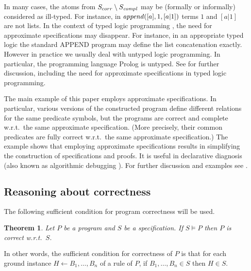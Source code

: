 \documentclass{tlp}
\newtheorem{theorem}{Theorem}
\newcommand*{\seq}[2][n]  {{#2_{1}, \allowbreak \ldots, \allowbreak #2_{#1}}}
\begin{document}
In many cases, the atoms from $S_{corr}\setminus S_{\it c o m p l}$ 
may be (formally or informally) considered as ill-typed.
For instance, in ${\it append}([a], 1, [a|1])$
terms $1$ and $[a|1]$ are not lists. 
In the context of typed logic programming \cite{types.lp.92-short},
the need for approximate specifications may disappear.
For instance, in an appropriate
typed logic the standard APPEND program may define the list concatenation exactly.
However in practice we usually deal with untyped logic programming.
In particular, the programming language Prolog is untyped.
See \cite{drabent.tocl16} for further discussion, including the need
for approximate specifications in typed logic programming. 





The main example of this paper employs approximate specifications.
In particular,
  various versions of the constructed program define different relations
  for the same predicate symbols, but the programs 
  are correct and complete w.r.t.\ the same approximate specification.
(More precisely, their common predicates are
fully correct w.r.t.\ the same approximate specification.)
The example shows that employing approximate specifications
results in simplifying the construction of specifications and proofs.
It is useful \cite{drabent.tocl16} in declarative diagnosis
(also known as algorithmic debugging \cite{Shapiro.book}).
For further discussion and examples see 
\cite{drabent.tocl16,DBLP:journals/tplp/DrabentM05shorter}.  












\subsection{Reasoning about correctness}
The following sufficient condition for program correctness
will be used.
\begin{theorem}
\label{th:correctness}
Let $P$ be a program and $S$ be a specification.
If  $S\models P$  then  $P$ is correct w.r.t.\ $S$.
\end{theorem}
\pagebreak[3]
In other words, the sufficient condition for correctness of $P$ is that
     for each ground instance 
    $
    H\gets \seq B
    $
    of a rule of $P$,
     if $\seq B\in S$ then $H\in S$.
\end{document}
